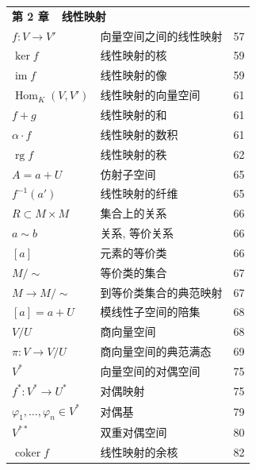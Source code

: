 \begin{longtable}{@{}l l r}
\multicolumn{3}{l}{\textbf{第 2 章\ \ 线性映射}} \\[2pt]
$f \colon V \longrightarrow V'$ & 向量空间之间的线性映射 & 57 \\
$\ker f$ & 线性映射的核 & 59 \\
$\operatorname{im} f$ & 线性映射的像 & 59 \\
$\operatorname{Hom}_K(V, V')$ & 线性映射的向量空间 & 61 \\
$f + g$ & 线性映射的和 & 61 \\
$\alpha \cdot f$ & 线性映射的数积 & 61 \\
$\operatorname{rg} f$ & 线性映射的秩 & 62 \\
$A = a + U$ & 仿射子空间 & 65 \\
$f^{-1}(a')$ & 线性映射的纤维 & 65 \\
$R \subset M \times M$ & 集合上的关系 & 66 \\
$a \sim b$ & 关系, 等价关系 & 66 \\
$[a]$ & 元素的等价类 & 66 \\
$M / \sim$ & 等价类的集合 & 67 \\
$M \longrightarrow M / \sim$ & 到等价类集合的典范映射 & 67 \\
$[a] = a + U$ & 模线性子空间的陪集 & 68 \\
$V / U$ & 商向量空间 & 68 \\
$\pi \colon V \longrightarrow V / U$ & 商向量空间的典范满态 & 69 \\
$V^*$ & 向量空间的对偶空间 & 75 \\
$f^* \colon V^* \longrightarrow U^*$ & 对偶映射 & 75 \\
$\varphi_1, \ldots, \varphi_n \in V^*$ & 对偶基 & 79 \\
$V^{**}$ & 双重对偶空间 & 80 \\
$\operatorname{coker} f$ & 线性映射的余核 & 82 \\
\hline


\end{longtable}
